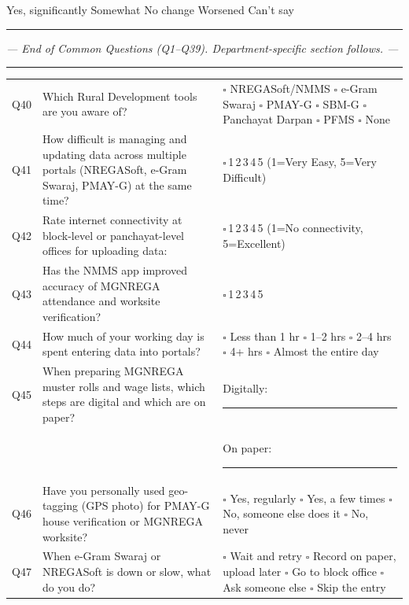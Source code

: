\documentclass[10pt,a4paper]{article}
\newcommand{\likert}{{\Large$\square$}\,1\quad{\Large$\square$}\,2\quad{\Large$\square$}\,3\quad{\Large$\square$}\,4\quad{\Large$\square$}\,5}
\begin{document}
\noindent {\Large$\square$} Yes, significantly\quad{\Large$\square$} Somewhat\quad{\Large$\square$} No change\quad{\Large$\square$} Worsened\quad{\Large$\square$} Can't say

\vspace{4pt}\noindent\rule{\textwidth}{1pt}\vspace{2pt}
\begin{center}\textit{--- End of Common Questions (Q1--Q39). Department-specific section follows. ---}\end{center}
\rule{\textwidth}{0.5pt}
\newpage
{}\vspace{4pt}

\noindent\begin{tabularx}{\textwidth}{@{}L{0.6cm} X L{5.5cm}@{}}
Q40 & Which Rural Development tools are you aware of? & {\Large$\square$} NREGASoft/NMMS {\Large$\square$} e-Gram Swaraj {\Large$\square$} PMAY-G {\Large$\square$} SBM-G {\Large$\square$} Panchayat Darpan {\Large$\square$} PFMS {\Large$\square$} None \\[3pt]
Q41 & How difficult is managing and updating data across multiple portals (NREGASoft, e-Gram Swaraj, PMAY-G) at the same time? & \likert{} {\scriptsize(1=Very Easy, 5=Very Difficult)} \\[3pt]
Q42 & Rate internet connectivity at block-level or panchayat-level offices for uploading data: & \likert{} {\scriptsize(1=No connectivity, 5=Excellent)} \\[3pt]
Q43 & Has the NMMS app improved accuracy of MGNREGA attendance and worksite verification? & \likert \\[3pt]
Q44 & How much of your working day is spent entering data into portals? & {\Large$\square$} Less than 1 hr {\Large$\square$} 1--2 hrs {\Large$\square$} 2--4 hrs {\Large$\square$} 4+ hrs {\Large$\square$} Almost the entire day \\[3pt]
Q45 & When preparing MGNREGA muster rolls and wage lists, which steps are digital and which are on paper? & Digitally: \rule{6cm}{0.4pt}\\[2pt] && On paper: \rule{6cm}{0.4pt} \\[3pt]
Q46 & Have you personally used geo-tagging (GPS photo) for PMAY-G house verification or MGNREGA worksite? & {\Large$\square$} Yes, regularly {\Large$\square$} Yes, a few times {\Large$\square$} No, someone else does it {\Large$\square$} No, never \\[3pt]
Q47 & When e-Gram Swaraj or NREGASoft is down or slow, what do you do? & {\Large$\square$} Wait and retry {\Large$\square$} Record on paper, upload later {\Large$\square$} Go to block office {\Large$\square$} Ask someone else {\Large$\square$} Skip the entry \\[3pt]

\end{tabularx}
\end{document}
